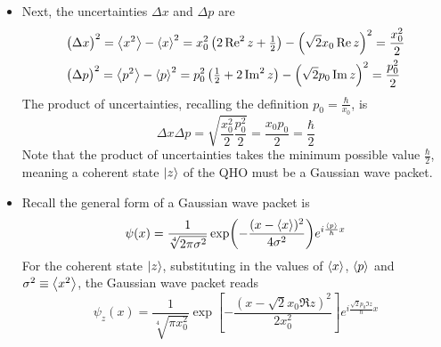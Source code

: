 \documentclass[11pt, a4paper]{article}
\begin{document}
\begin{itemize}
	\item Next, the uncertainties $ \Delta x $ and $ \Delta p $ are
	\begin{align*}
		&\big(\Delta x\big)^{2} = \ev{x^{2}} - \ev{x}^{2} = x_{0}^{2}\left(2 \Re^{2}z + \tfrac{1}{2}\right) - \left(\sqrt{2}x_{0}\Re z\right)^{2} = \frac{x_{0}^{2}}{2}\\
		&\big(\Delta p\big)^{2} = \ev{p^{2}} - \ev{p}^{2} = p_{0}^{2}\left(\tfrac{1}{2} + 2 \Im^{2}z\right) - \left(\sqrt{2}p_{0}\Im z\right)^{2} = \frac{p_{0}^{2}}{2}
	\end{align*}
	The product of uncertainties, recalling the definition $ p_{0} = \frac{\hbar}{x_{0}} $, is 
	\begin{equation*}
		\Delta x \Delta p = \sqrt{\frac{x_{0}^{2}}{2}\frac{p_{0}^{2}}{2}} = \frac{x_{0}p_{0}}{2} = \frac{\hbar}{2}
	\end{equation*}
	Note that the product of uncertainties takes the minimum possible value $ \frac{\hbar}{2} $, meaning a coherent state $ \ket{z} $ of the QHO must be a Gaussian wave packet. 
	
	\item Recall the general form of a Gaussian wave packet is
	\begin{equation*}
		\psi(x) = \frac{1}{\sqrt[4]{2\pi\sigma^{2}}}\exp(-\frac{(x-\ev{x})^{2}}{4\sigma^{2}})e^{i \frac{\ev{p}}{\hbar}x}
	\end{equation*}
	For the coherent state $ \ket{z} $, substituting in the values of $ \ev{x} $, $ \ev{p} $ and $ \sigma^{2} \equiv \ev{x^{2}} $, the Gaussian wave packet reads
	\begin{equation*}
		\psi_{z}(x) = \frac{1}{\sqrt[4]{\pi x_{0}^{2}}}\exp\left[-\frac{\left(x-\sqrt{2}x_{0}\Re z\right)^{2}}{2x_{0}^{2}}\right]e^{i \frac{\sqrt{2}p_{0}\Im z}{\hbar}x}
	\end{equation*}
	

\end{itemize}
\end{document}
